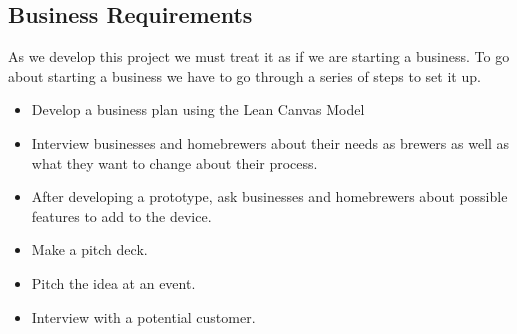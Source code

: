 \documentclass[draftclsnofoot,onecolumn,letterpaper,10pt]{IEEEtran}
\begin{document}
\subsection{Business Requirements}
As we develop this project we must treat it as if we are starting a business.
To go about starting a business we have to go through a series of steps to set it up.
\begin{itemize}
	\item Develop a business plan using the Lean Canvas Model
	\item Interview businesses and homebrewers about their needs as brewers as well as what they want to change about their process.
	\item After developing a prototype, ask businesses and homebrewers about possible features to add to the device.
	\item Make a pitch deck.
	\item Pitch the idea at an event.
	\item Interview with a potential customer.
\end{itemize}
\end{document}
